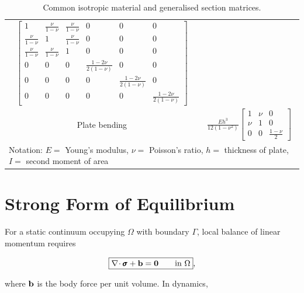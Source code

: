 \begin{table}[ht]
{\begin{tabular}{||c c||}
\begin{math}
\begin{bmatrix}
                1 & \frac{\nu}{1 - \nu} & \frac{\nu}{1 - \nu} & 0 & 0 & 0 \\
                \frac{\nu}{1 - \nu} & 1 & \frac{\nu}{1 - \nu} & 0 & 0 & 0 \\
                \frac{\nu}{1 - \nu} & \frac{\nu}{1 - \nu} & 1 & 0 & 0 & 0 \\
                0 & 0 & 0 & \frac{1 - 2 \nu}{2 \left(1 - \nu \right)} & 0 & 0 \\
                0 & 0 & 0 & 0 & \frac{1 - 2 \nu}{2 \left(1 - \nu \right)} & 0 \\
                0 & 0 & 0 & 0 & 0 & \frac{1 - 2 \nu}{2 \left(1 - \nu \right)}
            \end{bmatrix}
        \end{math} \\
        Plate bending & \begin{math}
            \frac{E h^3}{12 \left(1 - \nu^2 \right)}
            \begin{bmatrix}
                1 & \nu & 0 \\
                \nu & 1 & 0 \\
                0 & 0 & \frac{1 - \nu}{2}
            \end{bmatrix}
        \end{math} \\
        \hline
        \hline
        \multicolumn{2}{l}{
            Notation:
            $ E = $ Young's modulus, $ \nu = $ Poisson's ratio,
            $ h = $ thickness of plate, $ I = $ second moment of area
        } \\
    \end{tabular}}
    \caption{Common isotropic material and generalised section matrices.}
    \label{tab:common-material-matrices}
\end{table}

\section{Strong Form of Equilibrium}

For a static continuum occupying $\Omega$ with boundary $\Gamma$, local
balance of linear momentum requires

\begin{equation}\label{eq:strong-equilibrium}
    \boxed{
    \nabla\!\cdot\pmb{\sigma}+\mathbf{b}=\mathbf{0}
    \qquad\text{in }\Omega
    },
\end{equation}

where $\mathbf{b}$ is the body force per unit volume. In dynamics,

